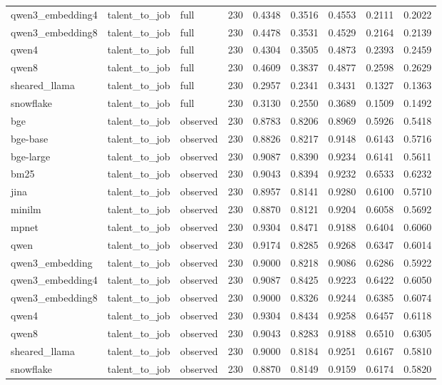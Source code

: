 \begin{table}[t]
\begin{tabular}{lllllllll}
qwen3_embedding4 & talent_to_job & full & 230 & 0.4348 & 0.3516 & 0.4553 & 0.2111 & 0.2022 \\
qwen3_embedding8 & talent_to_job & full & 230 & 0.4478 & 0.3531 & 0.4529 & 0.2164 & 0.2139 \\
qwen4 & talent_to_job & full & 230 & 0.4304 & 0.3505 & 0.4873 & 0.2393 & 0.2459 \\
qwen8 & talent_to_job & full & 230 & 0.4609 & 0.3837 & 0.4877 & 0.2598 & 0.2629 \\
sheared_llama & talent_to_job & full & 230 & 0.2957 & 0.2341 & 0.3431 & 0.1327 & 0.1363 \\
snowflake & talent_to_job & full & 230 & 0.3130 & 0.2550 & 0.3689 & 0.1509 & 0.1492 \\
bge & talent_to_job & observed & 230 & 0.8783 & 0.8206 & 0.8969 & 0.5926 & 0.5418 \\
bge-base & talent_to_job & observed & 230 & 0.8826 & 0.8217 & 0.9148 & 0.6143 & 0.5716 \\
bge-large & talent_to_job & observed & 230 & 0.9087 & 0.8390 & 0.9234 & 0.6141 & 0.5611 \\
bm25 & talent_to_job & observed & 230 & 0.9043 & 0.8394 & 0.9232 & 0.6533 & 0.6232 \\
jina & talent_to_job & observed & 230 & 0.8957 & 0.8141 & 0.9280 & 0.6100 & 0.5710 \\
minilm & talent_to_job & observed & 230 & 0.8870 & 0.8121 & 0.9204 & 0.6058 & 0.5692 \\
mpnet & talent_to_job & observed & 230 & 0.9304 & 0.8471 & 0.9188 & 0.6404 & 0.6060 \\
qwen & talent_to_job & observed & 230 & 0.9174 & 0.8285 & 0.9268 & 0.6347 & 0.6014 \\
qwen3_embedding & talent_to_job & observed & 230 & 0.9000 & 0.8218 & 0.9086 & 0.6286 & 0.5922 \\
qwen3_embedding4 & talent_to_job & observed & 230 & 0.9087 & 0.8425 & 0.9223 & 0.6422 & 0.6050 \\
qwen3_embedding8 & talent_to_job & observed & 230 & 0.9000 & 0.8326 & 0.9244 & 0.6385 & 0.6074 \\
qwen4 & talent_to_job & observed & 230 & 0.9304 & 0.8434 & 0.9258 & 0.6457 & 0.6118 \\
qwen8 & talent_to_job & observed & 230 & 0.9043 & 0.8283 & 0.9188 & 0.6510 & 0.6305 \\
sheared_llama & talent_to_job & observed & 230 & 0.9000 & 0.8184 & 0.9251 & 0.6167 & 0.5810 \\
snowflake & talent_to_job & observed & 230 & 0.8870 & 0.8149 & 0.9159 & 0.6174 & 0.5820 \\
\bottomrule
\end{tabular}
\end{table}
